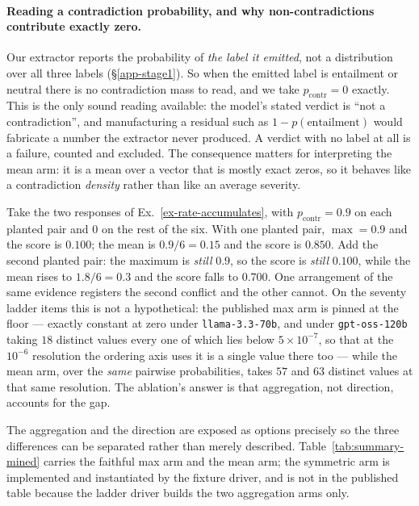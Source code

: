 \paragraph{Reading a contradiction probability, and why non-contradictions contribute exactly zero.}
Our extractor reports the probability of \emph{the label it emitted}, not a distribution over all
three labels (\S\ref{app-stage1}). So when the emitted label is entailment or neutral there is no
contradiction mass to read, and we take $p_{\mathrm{contr}}=0$ exactly. This is the only sound reading
available: the model's stated verdict is ``not a contradiction'', and manufacturing a residual such as
$1-p(\text{entailment})$ would fabricate a number the extractor never produced. A verdict with no
label at all is a failure, counted and excluded. The consequence matters for interpreting the mean
arm: it is a mean over a vector that is mostly exact zeros, so it behaves like a contradiction
\emph{density} rather than like an average severity.

\begin{example}
\label{ex-max-saturates}
Take the two responses of Ex.~\ref{ex-rate-accumulates}, with $p_{\mathrm{contr}}=0.9$ on each planted
pair and $0$ on the rest of the six. With one planted pair, $\max = 0.9$ and the score is $0.100$; the
mean is $0.9/6 = 0.15$ and the score is $0.850$. Add the second planted pair: the maximum is
\emph{still} $0.9$, so the score is \emph{still} $0.100$, while the mean rises to $1.8/6=0.3$ and the
score falls to $0.700$. One arrangement of the same evidence registers the second conflict and the
other cannot. On the seventy ladder items this is not a hypothetical: the published max arm is pinned
at the floor --- exactly constant at zero under \texttt{llama-3.3-70b}, and under
\texttt{gpt-oss-120b} taking $18$ distinct values every one of which lies below $5\times10^{-7}$, so
that at the $10^{-6}$ resolution the ordering axis uses it is a single value there too --- while the
mean arm, over the \emph{same} pairwise probabilities, takes $57$ and $63$ distinct values at that
same resolution. The ablation's answer is that aggregation, not direction, accounts for the gap.
\end{example}

The aggregation and the direction are exposed as options precisely so the three differences can be
separated rather than merely described. Table~\ref{tab:summary-mined} carries the faithful max arm and
the mean arm; the symmetric arm is implemented and instantiated by the fixture driver, and is not in
the published table because the ladder driver builds the two aggregation arms only.


